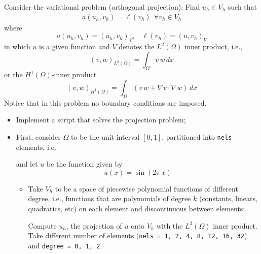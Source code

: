 \begin{kaobox}
Consider the variational problem (orthogonal projection):
Find $u_h \in V_h$ such that
\begin{eqnarray}
  a(u_h,v_h) = \ell(v_h)  ~~\forall v_h \in V_h \nonumber
\end{eqnarray}
where
$$
a(u_h,v_h) =  (u_h,v_h)_V,~~~~\ell(v_h) = (u,v_h)_V
$$
in which $u$ is a given function and $V$ denotes the $L^2(\Omega)$ inner product, i.e.,
\begin{equation}
(v,w)_{L^2(\Omega)} = \int_{\Omega}{v\,w}\,dx \nonumber
\end{equation}
or the $H^1(\Omega)$-inner product
\begin{equation}
(v,w)_{H^1(\Omega)} = \int_{\Omega}{\left (v\,w + \nabla{v} \cdot \nabla{w}\right )}\,dx \nonumber
\end{equation}
Notice that in this problem no boundary conditions are imposed.

\begin{itemize}

\item Implement a script that solves the projection problem;\\

\item First, consider $\Omega$ to be the unit interval $[0,1]$,
partitioned into \texttt{nels} elements, i.e.

\begin{center}
\begin{minipage}{0.9\textwidth}
    
\end{minipage}
\end{center}

and let $u$ be the function given by
$$
u(x) = \sin(2\pi\,x)
$$

\begin{itemize}
\item Take $V_h$ to be a space of piecewise polynomial functions of different degree,
i.e., functions that are polynomials of degree $k$ (constants, linears, quadratics, etc)
on each element and discontinuous between elements:
\begin{center}
\begin{minipage}{0.8\textwidth}
    
\end{minipage}
\end{center}
Compute $u_h$, the projection of $u$ onto $V_h$ with the $L^2(\Omega)$ inner product.
Take different number of elements (\texttt{nels = 1, 2, 4, 8, 12, 16, 32})
and \texttt{degree = 0, 1, 2}. \\


\end{itemize}
\end{itemize}
\end{kaobox}
